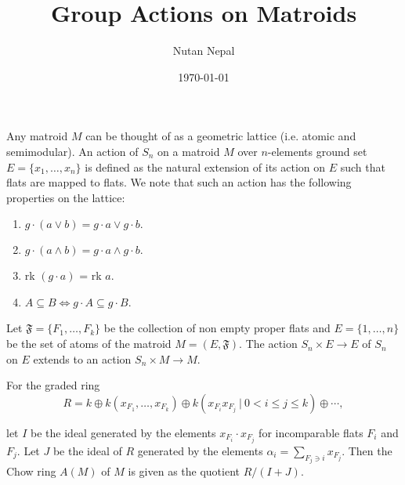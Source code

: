 \documentclass[12pt]{article}
\title{Group Actions on Matroids}
\author{Nutan Nepal}
\date{\today}
\begin{document}
\maketitle

\hspace*{5mm} Any matroid $M$ can be thought of as a geometric
lattice (i.e. atomic and semimodular). An action of $S_n$ on a matroid $M$ over $n$-elements ground set $E=\{x_1,\ldots,x_n\}$ is defined
as the natural extension of its action on $E$
such that flats are mapped to flats. We note that such an action has the following properties
on the lattice:

\begin{enumerate}
    \item $g\cdot(a \vee b) = g\cdot a\vee g\cdot b.$
    \item $g\cdot(a \wedge b) = g\cdot a\wedge g\cdot b.$
    \item rk $(g\cdot a)$ = rk $a$.
    \item $A\subseteq B \iff g\cdot A\subseteq g\cdot B$.
\end{enumerate}

Let $\mathfrak{F}=\{F_1,\ldots,F_k\}$ be the collection of non empty proper flats and $E=\{1,\ldots,n\}$ be the set of
atoms of the matroid $M=(E,\mathfrak{F})$. The action $S_n \times E\to E$ of $S_n$ on $E$ extends to an action $S_n \times M
    \to M$.


For the graded ring $$R = k \oplus k(x_{F_1},\ldots,x_{F_k})
    \oplus k(x_{F_i}x_{F_j}\ |\ 0<i\leq j\leq k)\oplus\cdots,$$

let $I$ be the ideal generated by the elements $x_{F_i}\cdot x_{F_j}$ for incomparable flats $F_i$ and $F_j$.
Let $J$ be the ideal of $R$ generated by the elements $\alpha_{i}=\sum_{F_j\ni i}x_{F_j}$.
Then the Chow ring $A(M)$ of $M$ is given as the quotient $R/(I+J)$.

\setcounter{section}{1}
\setcounter{theorem}{1}
\end{document}
